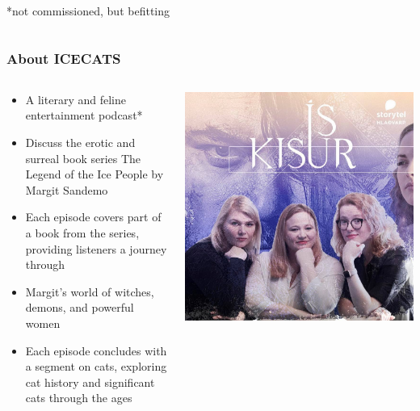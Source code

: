 \begin{frame}
\begin{columns}[T]
\begin{column}{0.4\textwidth}
            \vspace{24pt}

            \scriptsize{*not commissioned, but befitting}
        \end{column}
    \end{columns}
\end{frame}

\begin{frame}
    \frametitle{About ICECATS}
    \begin{columns}[T]
        \begin{column}{0.55\textwidth}
            \begin{itemize}
                \item A literary and feline entertainment podcast*
                \item Discuss the erotic and surreal book series The Legend of the Ice People by Margit Sandemo
                \item Each episode covers part of a book from the series, providing listeners a journey through
                \item Margit's
                world of witches, demons, and powerful women
                \item Each episode concludes with a segment on cats, exploring cat history and significant
                cats through the ages
            \end{itemize}
        \end{column}
        \begin{column}{0.45\textwidth}
            \centering
            \includegraphics[width=\textwidth]{../figures/podcast_image.jpg}

\end{column}
\end{columns}
\end{frame}
